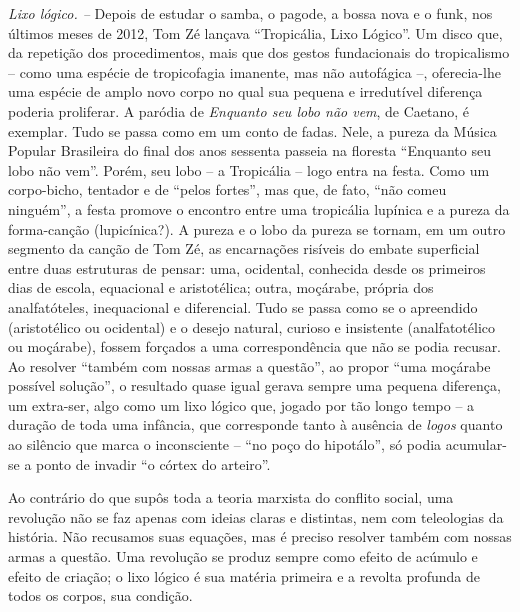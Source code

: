 \emph{Lixo lógico. --} Depois de estudar o samba, o pagode, a bossa nova
e o funk, nos últimos meses de 2012, Tom Zé lançava ``Tropicália, Lixo
Lógico''. Um disco que, da repetição dos procedimentos, mais que dos
gestos fundacionais do tropicalismo -- como uma espécie de tropicofagia
imanente, mas não autofágica --, oferecia-lhe uma espécie de amplo novo
corpo no qual sua pequena e irredutível diferença poderia proliferar. A
paródia de \emph{Enquanto seu lobo não vem}, de Caetano, é exemplar.
Tudo se passa como em um conto de fadas. Nele, a pureza da Música
Popular Brasileira do final dos anos sessenta passeia na floresta
``Enquanto seu lobo não vem''. Porém, seu lobo -- a Tropicália -- logo
entra na festa. Como um corpo-bicho, tentador e de ``pelos fortes'', mas
que, de fato, ``não comeu ninguém'', a festa promove o encontro entre
uma tropicália lupínica e a pureza da forma-canção (lupicínica?). A
pureza e o lobo da pureza se tornam, em um outro segmento da canção de
Tom Zé, as encarnações risíveis do embate superficial entre duas
estruturas de pensar: uma, ocidental, conhecida desde os primeiros dias
de escola, equacional e aristotélica; outra, moçárabe, própria dos
analfatóteles, inequacional e diferencial. Tudo se passa como se o
apreendido (aristotélico ou ocidental) e o desejo natural, curioso e
insistente (analfatotélico ou moçárabe), fossem forçados a uma
correspondência que não se podia recusar. Ao resolver ``também com
nossas armas a questão'', ao propor ``uma moçárabe possível solução'', o
resultado quase igual gerava sempre uma pequena diferença, um extra-ser,
algo como um lixo lógico que, jogado por tão longo tempo -- a duração de
toda uma infância, que corresponde tanto à ausência de \emph{logos}
quanto ao silêncio que marca o inconsciente -- ``no poço do hipotálo'',
só podia acumular-se a ponto de invadir ``o córtex do arteiro''.

Ao contrário do que supôs toda a teoria marxista do conflito social, uma
revolução não se faz apenas com ideias claras e distintas, nem com
teleologias da história. Não recusamos suas equações, mas é preciso
resolver também com nossas armas a questão. Uma revolução se produz
sempre como efeito de acúmulo e efeito de criação; o lixo lógico é sua
matéria primeira e a revolta profunda de todos os corpos, sua condição.

